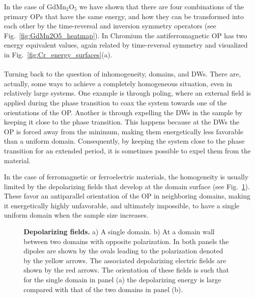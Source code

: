 In the case of GdMn$_2$O$_5$ we have shown that there are four combinations of the primary OPs that have the same energy, and how they can be transformed into each other by the time-reversal and inversion symmetry operators (see Fig.~\ref{fig:GdMn2O5_heatmap}). 
In Chromium the antiferromagnetic OP has two energy equivalent values, again related by time-reversal symmetry and visualized in Fig.~\ref{fig:Cr_energy_surfaces}(a).
\\\\
Turning back to the question of inhomogeneity, domains, and DWs.
There are, actually, some ways to achieve a completely homogeneous situation, even in relatively large systems.
One example is through poling, where an external field is applied during the phase transition to coax the system towards one of the orientations of the OP.
Another is through expelling the DWs in the sample by keeping it close to the phase transition.
This happens because at the DWs the OP is forced away from the minimum, making them energetically less favorable than a uniform domain.
Consequently, by keeping the system close to the phase transition for an extended period, it is sometimes possible to expel them from the material.

In the case of ferromagnetic or ferroelectric materials, the homogeneity is usually limited by the depolarizing fields that develop at the domain surface (see Fig.~\ref{fig:BTO_depolarizing_schematic}).
These favor an antiparallel orientation of the OP in neighboring domains, making it energetically highly unfavorable, and ultimately impossible, to have a single uniform domain when the sample size increases.
\begin{figure}[h]
	\caption{\label{fig:BTO_depolarizing_schematic}{\bf Depolarizing fields.} a) A single domain. b) At a domain wall between two domains with opposite polarization. In both panels the dipoles are shown by the ovals leading to the polarization denoted by the yellow arrows. The associated depolarizing electric fields are shown by the red arrows. The orientation of these fields is such that for the single domain in panel (a) the depolarizing energy is large compared with that of the two domains in panel (b).}    
\end{figure}


